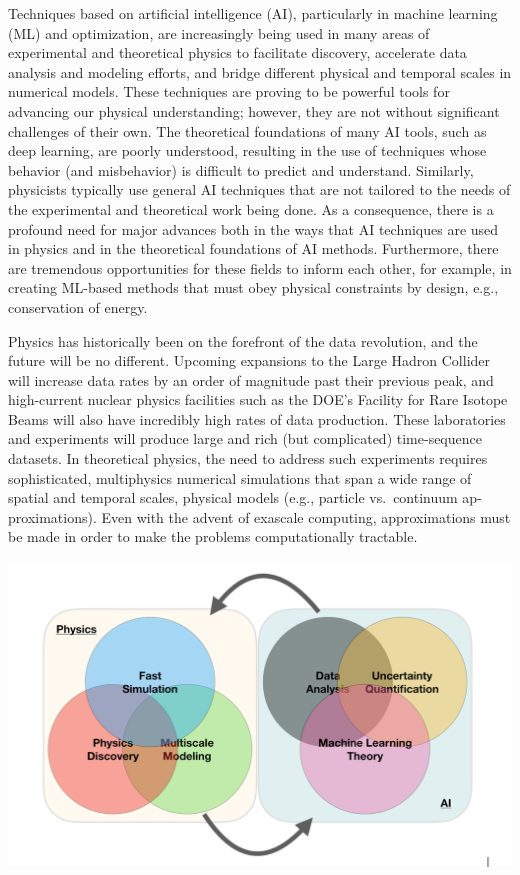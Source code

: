 \documentclass[%
oneside,                 %
final,                   %
10pt]{article}
\begin{document}
Techniques based on artificial intelligence (AI), particularly in
machine learning (ML) and optimization, are increasingly being used in
many areas of experimental and theoretical physics to facilitate
discovery, accelerate data analysis and modeling efforts, and bridge
different physical and temporal scales in numerical models. These 
techniques are proving to be powerful tools for advancing our physical
understanding; however, they are not without significant challenges
of their own. The theoretical foundations of many AI tools, such as
deep learning, are poorly understood, resulting in the use of
techniques whose behavior (and misbehavior) is difficult to predict
and understand. Similarly, physicists typically use general AI
techniques that are not tailored to the needs of the experimental and
theoretical work being done. As a consequence, there is a profound
need for major advances both in the ways that AI techniques are used
in physics and in the theoretical foundations of AI
methods. Furthermore, there are tremendous opportunities for these
fields to inform each other, for example, in creating ML-based
methods that must obey physical constraints by design, e.g.,
conservation of energy.



Physics has historically been on the forefront of the data revolution,
and the future will be no different. Upcoming expansions to the
Large Hadron Collider will increase data rates by an order of
magnitude past their previous peak, and high-current nuclear physics
facilities such as the DOE’s Facility for Rare Isotope Beams will also
have incredibly high rates of data production. These laboratories and experiments
will produce large and rich (but
complicated) time-sequence datasets. In theoretical physics, the need
to address such experiments requires sophisticated, multiphysics
numerical simulations that span a wide range of spatial and temporal
scales, physical models (e.g., particle vs.~continuum ap-
proximations). Even with the advent of exascale
computing, approximations must be made in order to make the problems
computationally tractable.




\centerline{\includegraphics[width=0.9\linewidth]{figures/mlimage.png}}
\end{document}
